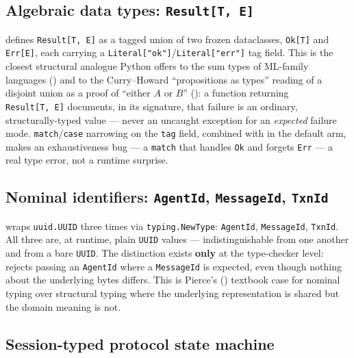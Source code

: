 \documentclass[
  english,
]{article}
\theoremstyle{definition}
\begin{document}
\subsection{\texorpdfstring{Algebraic data types:
\texttt{Result{[}T,\ E{]}}}{Algebraic data types: Result{[}T, E{]}}}\label{algebraic-data-types-resultt-e}

 defines
\texttt{Result{[}T,\ E{]}} as a tagged union of two frozen dataclasses,
\texttt{Ok{[}T{]}} and \texttt{Err{[}E{]}}, each carrying a
\texttt{Literal{[}"ok"{]}}/\texttt{Literal{[}"err"{]}} tag field. This
is the closest structural analogue Python offers to the sum types of
ML-family languages (\citet{milner1978theory}) and to the Curry--Howard
``propositions as types'' reading of a disjoint union as a proof of
``either \(A\) or \(B\)'' (\citet{wadler2015propositions}): a function
returning \texttt{Result{[}T,\ E{]}} documents, in its signature, that
failure is an ordinary, structurally-typed value --- never an uncaught
exception for an \emph{expected} failure mode.
\texttt{match}/\texttt{case} narrowing on the \texttt{tag} field,
combined with  in the default arm, makes an
exhaustiveness bug --- a \texttt{match} that handles \texttt{Ok} and
forgets \texttt{Err} --- a real  type error,
not a runtime surprise.

\subsection{\texorpdfstring{Nominal identifiers: \texttt{AgentId},
\texttt{MessageId},
\texttt{TxnId}}{Nominal identifiers: AgentId, MessageId, TxnId}}\label{nominal-identifiers-agentid-messageid-txnid}

 wraps \texttt{uuid.UUID}
three times via \texttt{typing.NewType}: \texttt{AgentId},
\texttt{MessageId}, \texttt{TxnId}. All three are, at runtime, plain
\texttt{UUID} values --- indistinguishable from one another and from a
bare \texttt{UUID}. The distinction exists \textbf{only} at the
type-checker level:  rejects passing an
\texttt{AgentId} where a \texttt{MessageId} is expected, even though
nothing about the underlying bytes differs. This is Pierce's
(\citet{pierce2002types}) textbook case for nominal typing over
structural typing where the underlying representation is shared but the
domain meaning is not.

\subsection{Session-typed protocol state
machine}\label{session-typed-protocol-state-machine}
\end{document}
